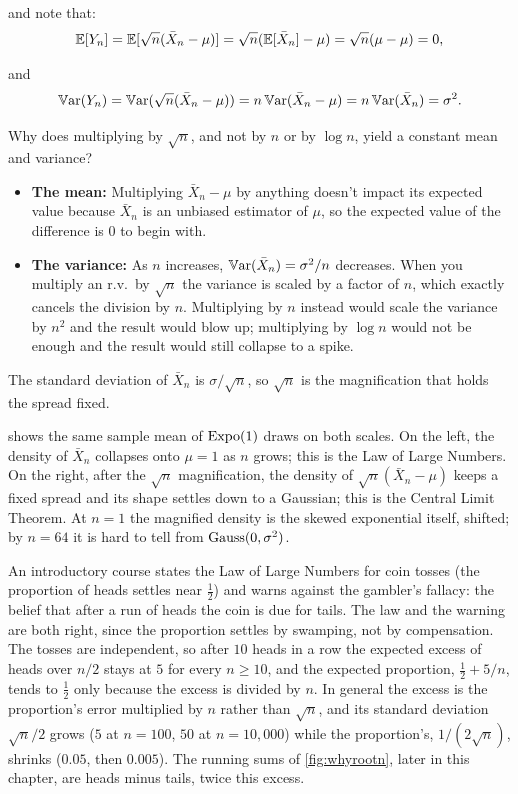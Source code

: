 and note that:
\[
\operatorname*{\mathbb{E}}[Y_n] = \operatorname*{\mathbb{E}}[\sqrt{n}(\bar{X}_n - \mu)] = \sqrt{n} (\operatorname*{\mathbb{E}}[\bar{X}_n] - \mu) = \sqrt{n} (\mu - \mu) = 0,
\]

and
\[
\operatorname*{\mathbb{V}\text{ar}}(Y_n) = \operatorname*{\mathbb{V}\text{ar}}(\sqrt{n}(\bar{X}_n - \mu)) = n \operatorname*{\mathbb{V}\text{ar}}(\bar{X}_n - \mu) = n \operatorname*{\mathbb{V}\text{ar}}(\bar{X}_n) = \sigma^2.
\]

\begin{intuition}
Why does multiplying by $\sqrt{n}$, and not by $n$ or by $\log n$, yield a constant mean and variance?
\begin{itemize}[nosep]
\item \textbf{The mean:} Multiplying $\bar{X}_n - \mu$ by anything doesn't impact its expected value because $\bar{X}_n$ is an unbiased estimator of $\mu$, so the expected value of the difference is $0$ to begin with.
\item \textbf{The variance:} As $n$ increases, $\operatorname*{\mathbb{V}\text{ar}}(\bar{X}_n) = \sigma^2/n$ decreases.
When you multiply an r.v.\ by $\sqrt{n}$ the variance is scaled by a factor of $n$, which exactly cancels the division by $n$.
Multiplying by $n$ instead would scale the variance by $n^2$ and the result would blow up; multiplying by $\log n$ would not be enough and the result would still collapse to a spike.
\end{itemize}
The standard deviation of $\bar{X}_n$ is $\sigma/\sqrt{n}$, so $\sqrt{n}$ is the magnification that holds the spread fixed.
\end{intuition}

 shows the same sample mean of $\text{Expo}(1)$ draws on both scales.
On the left, the density of $\bar{X}_n$ collapses onto $\mu = 1$ as $n$ grows; this is the Law of Large Numbers.
On the right, after the $\sqrt{n}$ magnification, the density of $\sqrt{n}(\bar{X}_n - \mu)$ keeps a fixed spread and its shape settles down to a Gaussian; this is the Central Limit Theorem.
At $n = 1$ the magnified density is the skewed exponential itself, shifted; by $n = 64$ it is hard to tell from $\text{Gauss}(0, \sigma^2)$.

\begin{bridge}
An introductory course states the Law of Large Numbers for coin tosses (the proportion of heads settles near $\frac12$) and warns against the gambler's fallacy: the belief that after a run of heads the coin is due for tails.
The law and the warning are both right, since the proportion settles by swamping, not by compensation.
The tosses are independent, so after $10$ heads in a row the expected excess of heads over $n/2$ stays at $5$ for every $n \geq 10$, and the expected proportion, $\frac12 + 5/n$, tends to $\frac12$ only because the excess is divided by $n$.
In general the excess is the proportion's error multiplied by $n$ rather than $\sqrt{n}$, and its standard deviation $\sqrt{n}/2$ grows ($5$ at $n = 100$, $50$ at $n = 10{,}000$) while the proportion's, $1/(2\sqrt{n})$, shrinks ($0.05$, then $0.005$).
The running sums of \cref{fig:whyrootn}, later in this chapter, are heads minus tails, twice this excess.
\end{bridge}

